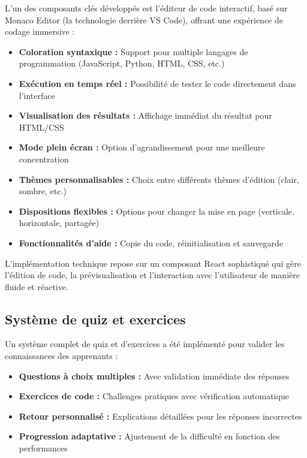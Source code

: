 L'un des composants clés développés est l'éditeur de code interactif, basé sur Monaco Editor (la technologie derrière VS Code), offrant une expérience de codage immersive :

\begin{itemize}
  \item \textbf{Coloration syntaxique :} Support pour multiple langages de programmation (JavaScript, Python, HTML, CSS, etc.)
  \item \textbf{Exécution en temps réel :} Possibilité de tester le code directement dans l'interface
  \item \textbf{Visualisation des résultats :} Affichage immédiat du résultat pour HTML/CSS
  \item \textbf{Mode plein écran :} Option d'agrandissement pour une meilleure concentration
  \item \textbf{Thèmes personnalisables :} Choix entre différents thèmes d'édition (clair, sombre, etc.)
  \item \textbf{Dispositions flexibles :} Options pour changer la mise en page (verticale, horizontale, partagée)
  \item \textbf{Fonctionnalités d'aide :} Copie du code, réinitialisation et sauvegarde
\end{itemize}

L'implémentation technique repose sur un composant React sophistiqué qui gère l'édition de code, la prévisualisation et l'interaction avec l'utilisateur de manière fluide et réactive.

\subsection{Système de quiz et exercices}

Un système complet de quiz et d'exercices a été implémenté pour valider les connaissances des apprenants :

\begin{itemize}
  \item \textbf{Questions à choix multiples :} Avec validation immédiate des réponses
  \item \textbf{Exercices de code :} Challenges pratiques avec vérification automatique
  \item \textbf{Retour personnalisé :} Explications détaillées pour les réponses incorrectes
  \item \textbf{Progression adaptative :} Ajustement de la difficulté en fonction des performances
\end{itemize}

